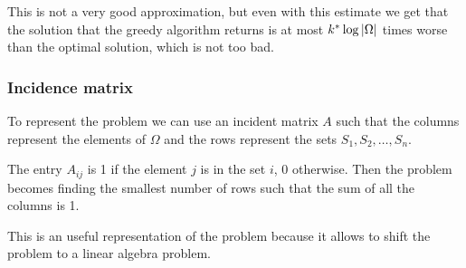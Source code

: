 \documentclass[12pt]{extarticle}
\begin{document}
This is not a very good approximation, but even with this estimate we get that the solution that the greedy algorithm returns is at most $k^* \log \abs{\Omega}$ times worse than the optimal solution, which is not too bad.

\subsubsection{Incidence matrix}

To represent the problem we can use an incident matrix $A$ such that the columns represent the elements of $\Omega$ and the rows represent the sets $S_1, S_2, \ldots, S_n$.

The entry $A_{ij}$ is 1 if the element $j$ is in the set $i$, 0 otherwise.
Then the problem becomes finding the smallest number of rows such that the sum of all the columns is 1.

This is an useful representation of the problem because it allows to shift the problem to a linear algebra problem.
\end{document}
